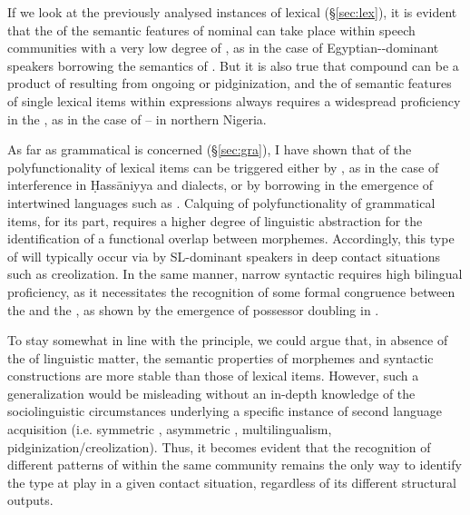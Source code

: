 \documentclass[output=paper]{langsci/langscibook}
\begin{document}
If we look at the previously analysed instances of lexical  (§\ref{sec:lex}), it is evident that the  of the semantic features of nominal  can take place within speech communities with a very low degree of , as in the case of {Egyptian}--dominant speakers borrowing the semantics of  . But it is also true that compound  can be a product of  resulting from ongoing  or pidginization, and the  of semantic features of single lexical items within  expressions always requires a widespread proficiency in the , as in the case of –  in northern Nigeria. 

As far as grammatical  is concerned (§\ref{sec:gra}), I have shown that  of the polyfunctionality of lexical items can be triggered either by , as in the case of  interference in Ḥass\-āniyya and  dialects, or by borrowing in the emergence of intertwined languages such as . Calquing of polyfunctionality of grammatical items, for its part, requires a higher degree of linguistic abstraction for the identification of a functional overlap between morphemes. Accordingly, this type of  will typically occur via  by SL-dominant speakers in deep contact situations such as creolization. In the same manner, narrow syntactic  requires high bilingual proficiency, as it necessitates the recognition of some formal congruence between the  and the , as shown by the emergence of possessor doubling in  .  

To stay somewhat in line with the  principle, we could argue that, in absence of the  of linguistic matter, the semantic properties of morphemes and syntactic constructions are more stable than those of lexical items. However, such a generalization would be misleading without an in-depth knowledge of the sociolinguistic circumstances underlying a specific instance of second language acquisition (i.e. symmetric , asymmetric , multilingualism, pidginization/creolization). Thus, it becomes evident that the recognition of different patterns of  within the same community remains the only way to identify the  type at play in a given contact situation, regardless of its different structural outputs.  
\end{document}
